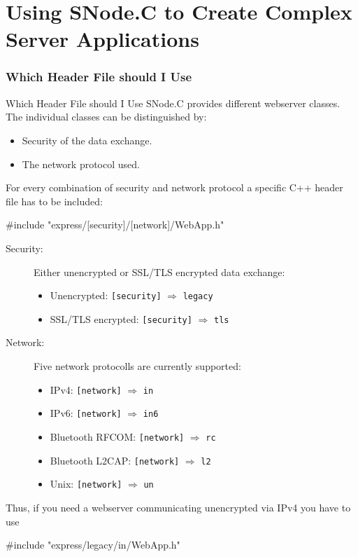 ﻿\part{Using SNode.C to Create Complex Server Applications}
\section[nosectionpage]{Which Header File should I Use}

\begin{frame}[fragile]{Which Header File should I Use}
  SNode.C provides different webserver classes. The individual classes can be distinguished by:
  \begin{itemize}
    \item Security of the data exchange.
    \item The network protocol used.
  \end{itemize}
  For every combination of security and network protocol a specific C++ header file has to be included:
  \begin{cppcode}[gobble=4]
    #include "express/[security]/[network]/WebApp.h"
  \end{cppcode}
  \begin{description}
    \item[Security:] Either unencrypted or SSL/TLS encrypted data exchange:
    \begin{itemize}
      \item Unencrypted: \texttt{\alert{[security]}} $\Rightarrow$ \texttt{\alert{legacy}}
      \item SSL/TLS encrypted: \texttt{\alert{[security]}} $\Rightarrow$ \texttt{\alert{tls}}
    \end{itemize}
    \item[Network:] Five network protocolls are currently supported:
    \begin{itemize}
      \item IPv4: \texttt{\alert{[network]}} $\Rightarrow$ \texttt{\alert{in}}
      \item IPv6: \texttt{\alert{[network]}} $\Rightarrow$ \texttt{\alert{in6}}
      \item Bluetooth RFCOM: \texttt{\alert{[network]}} $\Rightarrow$ \texttt{\alert{rc}}
      \item Bluetooth L2CAP: \texttt{\alert{[network]}} $\Rightarrow$ \texttt{\alert{l2}}
      \item Unix: \texttt{\alert{[network]}} $\Rightarrow$ \texttt{\alert{un}}
    \end{itemize}
  \end{description}
  \vspace{0.5cm}
  Thus, if you need a webserver communicating unencrypted via IPv4 you have to use
  \begin{cppcode}[gobble=4]
    #include "express/legacy/in/WebApp.h"
  \end{cppcode}
\end{frame}
